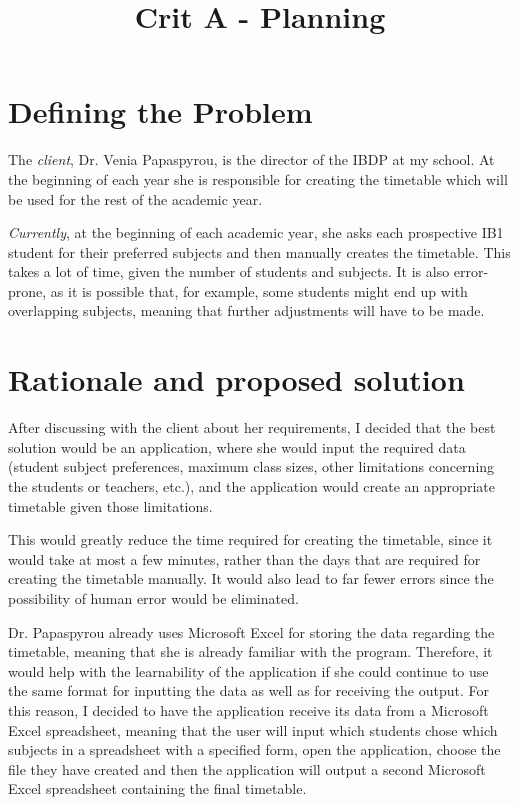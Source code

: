 \documentclass[a4paper, 12pt]{article}
\title{Crit A - Planning}
\date{}
\begin{document}
\maketitle

\section{Defining the Problem}

The \emph{client}, Dr. Venia Papaspyrou, is the director of the IBDP at my school. At the
beginning of each year she is responsible for creating the timetable which will be used for
the rest of the academic year. 

\emph{Currently}, at the beginning of each academic year, she asks each prospective IB1
student for their preferred subjects and then manually creates the timetable. This takes a
lot of time, given the number of students and subjects. It is also error-prone, as it is
possible that, for example, some students might end up with overlapping subjects, meaning
that further adjustments will have to be made. 

\section{Rationale and proposed solution}

After discussing with the client about her requirements, I decided that the best solution
would be an application, where she would input the required data (student subject
preferences, maximum class sizes, other limitations concerning the students or teachers,
etc.), and the application would create an appropriate timetable given those limitations. 

This would greatly reduce the time required for creating the timetable, since it would take
at most a few minutes, rather than the days that are required for creating the timetable
manually. It would also lead to far fewer errors since the possibility of human error would
be eliminated. 

Dr. Papaspyrou already uses Microsoft Excel for storing the data regarding the timetable,
meaning that she is already familiar with the program. Therefore, it would help with the
learnability of the application if she could continue to use the same format for inputting
the data as well as for receiving the output. For this reason, I decided to have the
application receive its data from a Microsoft Excel spreadsheet, meaning that the user will
input which students chose which subjects in a spreadsheet with a specified form, open the
application, choose the file they have created and then the application will output a second
Microsoft Excel spreadsheet containing the final timetable.
\end{document}
